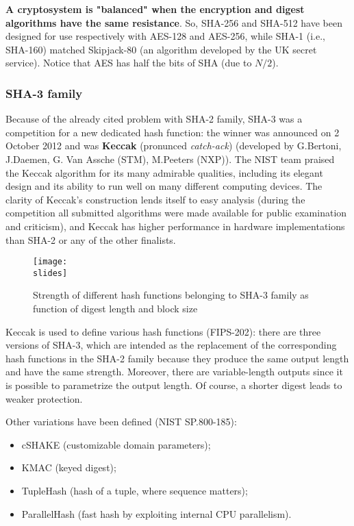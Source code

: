 \textbf{A cryptosystem is "balanced" when the encryption and digest algorithms have the same resistance}. So, SHA-256 and SHA-512 have been designed for use respectively with AES-128 and AES-256, while SHA-1 (i.e., SHA-160) matched Skipjack-80 (an algorithm developed by the UK secret service). Notice that AES has half the bits of SHA (due to $N/2$).


\subsubsection{SHA-3 family}
Because of the already cited problem with SHA-2 family, SHA-3 was a competition for a new dedicated hash
function: the winner was announced on 2 October 2012 and was \textbf{Keccak} (pronunced \textit{catch-ack}) (developed by G.Bertoni, J.Daemen, G. Van Assche (STM), M.Peeters (NXP)).
The NIST team praised the Keccak algorithm for its many admirable qualities, including its elegant design and its ability to run well on many different computing devices.
The clarity of Keccak's construction lends itself to easy analysis (during the competition all submitted algorithms
were made available for public examination and criticism), and Keccak has higher performance in hardware
implementations than SHA-2 or any of the other finalists.

\begin{figure}[h]
    \centering
    \texttt{[image: \\slides]}
    \caption{Strength of different hash functions belonging to SHA-3 family as function of digest
        length and block size}
\end{figure}

Keccak is used to define various hash functions (FIPS-202): there are three versions of SHA-3, which are intended as the replacement of the corresponding hash functions in the SHA-2 family because they produce the same output length and have the same strength. Moreover, there are variable-length outputs since it is possible to parametrize the output length. Of course, a shorter digest leads to weaker protection.

Other variations have been defined (NIST SP.800-185):
\begin{itemize}
    \item cSHAKE (customizable domain parameters);
    \item KMAC (keyed digest);
    \item TupleHash (hash of a tuple, where sequence matters);
    \item ParallelHash (fast hash by exploiting internal CPU parallelism).
\end{itemize}


